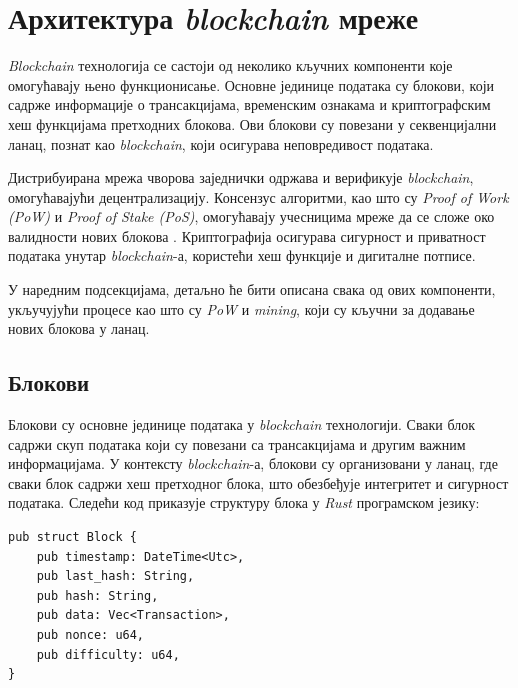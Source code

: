 \documentclass[12pt, a4paper]{article}
\begin{document}
\newpage
\section{Архитектура \textit{blockchain} мреже}
\textit{Blockchain} технологија се састоји од неколико кључних компоненти које омогућавају њено функционисање. Основне јединице података су блокови, који садрже информације о трансакцијама, временским ознакама и криптографским хеш функцијама претходних блокова. Ови блокови су повезани у секвенцијални ланац, познат као \textit{blockchain}, који осигурава неповредивост података. 

Дистрибуирана мрежа чворова заједнички одржава и верификује \textit{blockchain}, омогућавајући децентрализацију. Консензус алгоритми, као што су \textit{Proof of Work (PoW)} и \textit{Proof of Stake (PoS)}, омогућавају учесницима мреже да се сложе око валидности нових блокова \cite{10}. Криптографија осигурава сигурност и приватност података унутар \textit{blockchain}-а, користећи хеш функције и дигиталне потписе. 

У наредним подсекцијама, детаљно ће бити описана свака од ових компоненти, укључујући процесе као што су \textit{PoW} и \textit{mining}, који су кључни за додавање нових блокова у ланац.


\subsection{Блокови}
Блокови су основне јединице података у \textit{blockchain} технологији. Сваки блок садржи скуп података који су повезани са трансакцијама и другим важним информацијама. У контексту \textit{blockchain}-а, блокови су организовани у ланац, где сваки блок садржи хеш претходног блока, што обезбеђује интегритет и сигурност података. Следећи код приказује структуру блока у \textit{Rust} програмском језику:

\begin{verbatim}
pub struct Block {
    pub timestamp: DateTime<Utc>,
    pub last_hash: String,
    pub hash: String,
    pub data: Vec<Transaction>,
    pub nonce: u64,
    pub difficulty: u64,
}
\end{verbatim}
\end{document}
